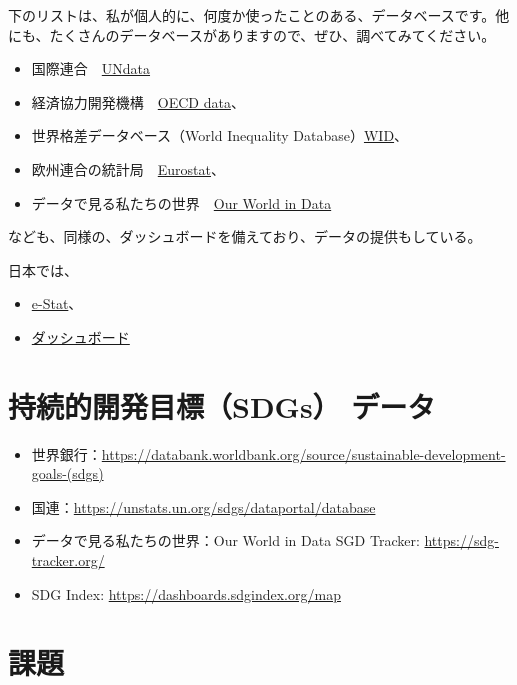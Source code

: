 \documentclass[
  xelatex, ja=standard]{bxjsbook}
\providecommand{\tightlist}{%
  \setlength{\itemsep}{0pt}\setlength{\parskip}{0pt}}
\theoremstyle{definition}
\theoremstyle{definition}
\theoremstyle{definition}
\theoremstyle{definition}
\theoremstyle{remark}
\begin{document}
下のリストは、私が個人的に、何度か使ったことのある、データベースです。他にも、たくさんのデータベースがありますので、ぜひ、調べてみてください。

\begin{itemize}
\tightlist
\item
  国際連合　\href{https://data.un.org}{UNdata}
\item
  経済協力開発機構　\href{https://data.oecd.org}{OECD data}、
\item
  世界格差データベース（World Inequality Database）\href{https://wid.world}{WID}、
\item
  欧州連合の統計局　\href{https://ec.europa.eu/eurostat}{Eurostat}、
\item
  データで見る私たちの世界　\href{https://ourworldindata.org}{Our World in Data}
\end{itemize}

なども、同様の、ダッシュボードを備えており、データの提供もしている。

日本では、

\begin{itemize}
\tightlist
\item
  \href{https://www.e-stat.go.jp/}{e-Stat}、
\item
  \href{https://dashboard.e-stat.go.jp}{ダッシュボード}
\end{itemize}

\hypertarget{ux6301ux7d9aux7684ux958bux767aux76eeux6a19sdgs-ux30c7ux30fcux30bf}{%
\section{持続的開発目標（SDGs） データ}\label{ux6301ux7d9aux7684ux958bux767aux76eeux6a19sdgs-ux30c7ux30fcux30bf}}

\begin{itemize}
\tightlist
\item
  世界銀行：\url{https://databank.worldbank.org/source/sustainable-development-goals-(sdgs)}
\item
  国連：\url{https://unstats.un.org/sdgs/dataportal/database}
\item
  データで見る私たちの世界：Our World in Data SGD Tracker: \url{https://sdg-tracker.org/}
\item
  SDG Index: \url{https://dashboards.sdgindex.org/map}
\end{itemize}

\hypertarget{ux8ab2ux984c}{%
\section{課題}\label{ux8ab2ux984c}}
\end{document}
